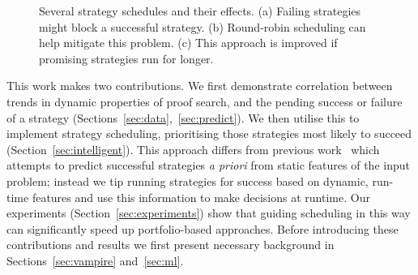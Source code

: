 \documentclass{llncs}
\newcommand{\tick}{\ding{51}}
\newcommand{\cross}{\ding{55}}
\begin{document}
\begin{figure}
\caption{Several strategy schedules and their effects. (a) Failing strategies might block a successful strategy. (b) Round-robin scheduling can help mitigate this problem. (c) This approach is improved if promising strategies run for longer.}
\label{fig:blocking}
\end{figure}

This work makes two contributions. 
We first demonstrate correlation between trends in dynamic properties of proof search, and the pending success or failure of a strategy (Sections~\ref{sec:data},~\ref{sec:predict}).
We then utilise this to implement strategy scheduling, prioritising those strategies most likely to succeed (Section~\ref{sec:intelligent}).
This approach differs from previous work~\cite{E,static1,static2} which attempts to predict successful strategies \emph{a priori} from static features of the input problem; instead we tip running strategies for success based on dynamic, run-time features and use this information to make decisions at runtime. Our experiments (Section~\ref{sec:experiments}) show that guiding scheduling in this way can significantly speed up portfolio-based approaches. Before introducing these contributions and results we first present necessary background in Sections~\ref{sec:vampire} and~\ref{sec:ml}.
\end{document}
